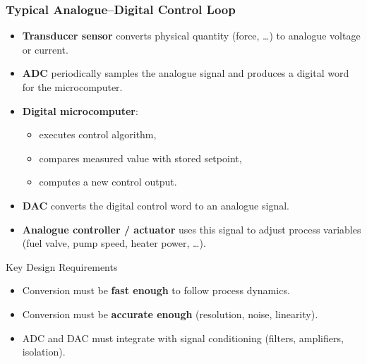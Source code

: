 \begin{frame}
	\frametitle{Typical Analogue--Digital Control Loop}
	\begin{itemize}
		\item \textbf{Transducer sensor} converts physical quantity (force, \dots) to analogue voltage or current.
		\item \textbf{ADC} periodically samples the analogue signal and produces a digital word for the microcomputer.
		\item \textbf{Digital microcomputer}:
		\begin{itemize}
			\item executes control algorithm,
			\item compares measured value with stored setpoint,
			\item computes a new control output.
		\end{itemize}
		\item \textbf{DAC} converts the digital control word to an analogue signal.
		\item \textbf{Analogue controller / actuator} uses this signal to adjust process variables (fuel valve, pump speed, heater power, \dots).
	\end{itemize}
		\begin{block}{Key Design Requirements}
		\begin{itemize}
			\item Conversion must be \textbf{fast enough} to follow process dynamics.
			\item Conversion must be \textbf{accurate enough} (resolution, noise, linearity).
			\item ADC and DAC must integrate with signal conditioning (filters, amplifiers, isolation).
		\end{itemize}
	\end{block}
\end{frame}

